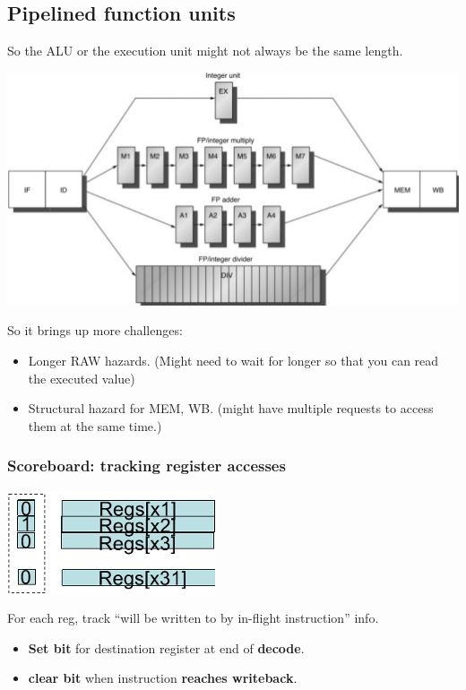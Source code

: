 \documentclass[letterpaper,12pt]{article}
\begin{document}
\subsection{Pipelined function units}

So the ALU or the execution unit might not always be the same length.

\includegraphics*[scale = 0.5]{./Image/ALU differnt length.png}

So it brings up more challenges:
\begin{itemize}
    \item Longer RAW hazards. (Might need to wait for longer so that you can read the executed value)
    \item Structural hazard for MEM, WB. (might have multiple requests to access them at the same time.)
\end{itemize}

\subsubsection{Scoreboard: tracking register accesses}

\includegraphics*{./Image/Score board.png}

For each reg, track ``will be written to by in-flight instruction'' info.

\begin{itemize}
    \item \textbf{Set bit} for destination register at end of \textbf{decode}.
    \item \textbf{clear bit} when instruction \textbf{reaches writeback}.
\end{itemize}
\end{document}
